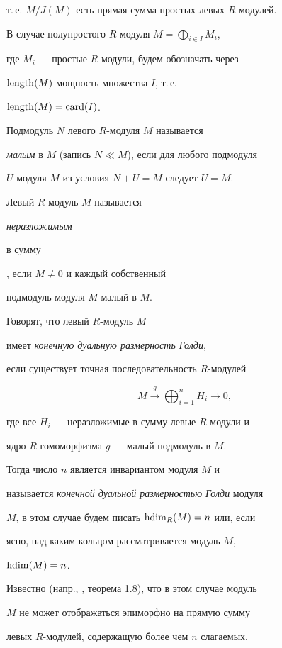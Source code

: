 т.\,е. $M/J(M)$ есть прямая сумма простых левых $R$-модулей.


В случае полупростого $R$-модуля $M=\bigoplus_{ i \in I} M_i$, 


где $M_i$ --- простые $R$-модули, будем обозначать через 


$\operatorname{length} (M)$ мощность множества $I$, т.\,е. 


$\operatorname{length} (M)=\operatorname{card}(I)$. 





Подмодуль $N$ левого $R$-модуля $M$ называется 


{\em малым} в $M$ (запись $N \ll M$), если для любого подмодуля 


$U$ модуля $M$ из условия $N + U = M$ следует $U = M$. 


Левый $R$-модуль $M$ называется {\em неразложимым 


в сумму}, если $M\neq 0$ и каждый собственный 


подмодуль модуля $M$ малый в $M$. 


Говорят, что левый $R$-модуль $M$ 


имеет {\em конечную дуальную размерность Голди}, 


если существует точная последовательность $R$-модулей


$$


M \overset{g}{\longrightarrow}{} \bigoplus_{i=1}^n H_i 


\longrightarrow 0,


$$


где все $H_i$ --- неразложимые в сумму левые $R$-модули и


ядро $R$-гомоморфизма $g$ --- малый подмодуль в $M$. 


Тогда число $n$ является инвариантом модуля $M$ и


называется {\em конечной дуальной размерностью Голди} модуля


$M$, в этом случае будем писать $\operatorname{hdim}_R(M) = n$ или, если 


ясно, над каким кольцом рассматривается модуль $M$, 


$\operatorname{hdim}(M)=n$.


 


Известно (напр., \cite{sarath}, теорема 1.8), что в этом случае модуль


$M$ не может отображаться эпиморфно на прямую сумму 


левых $R$-модулей, содержащую более чем $n$ слагаемых.


